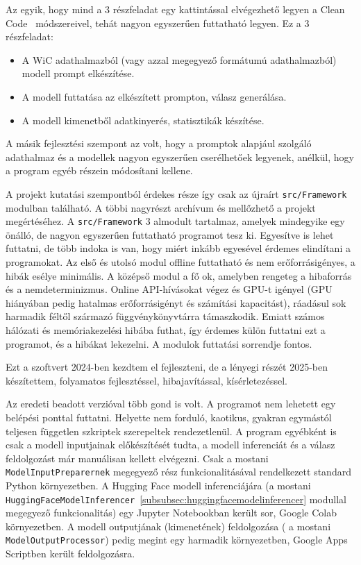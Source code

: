 \documentclass[12pt]{report}
\begin{document}
    Az egyik, hogy mind a 3 részfeladat egy kattintással elvégezhető legyen a Clean Code~\cite{martin2008cleancode} módszereivel, tehát nagyon egyszerűen futtatható legyen. Ez a 3 részfeladat:
    \begin{itemize}
        \item A WiC adathalmazból (vagy azzal megegyező formátumú adathalmazból) modell prompt elkészítése.
        \item A modell futtatása az elkészített prompton, válasz generálása.
        \item A modell kimenetből adatkinyerés, statisztikák készítése.
    \end{itemize}

    A másik fejlesztési szempont az volt, hogy a promptok alapjául szolgáló adathalmaz és a modellek nagyon egyszerűen cserélhetőek legyenek, anélkül, hogy a program egyéb részein módosítani kellene.


    A projekt kutatási szempontból érdekes része így csak az újraírt \texttt{\allowbreak src/Framework} modulban található.
    A többi nagyrészt archívum és mellőzhető a projekt megértéséhez.
    A \texttt{\allowbreak src/Framework} 3 almodult tartalmaz, amelyek mindegyike egy önálló, de nagyon egyszerűen futtatható programot tesz ki. Egyesítve is lehet futtatni, de több indoka is van, hogy miért inkább egyesével érdemes elindítani a programokat. Az első és utolsó modul offline futtatható és nem erőforrásigényes, a hibák esélye minimális. A középső modul a fő ok, amelyben rengeteg a hibaforrás és a nemdeterminizmus. Online API-hívásokat végez és GPU-t igényel (GPU hiányában pedig hatalmas erőforrásigényt és számítási kapacitást), ráadásul sok harmadik féltől származó függvénykönyvtárra támaszkodik. Emiatt számos hálózati és memóriakezelési hibába futhat, így érdemes külön futtatni ezt a programot, és a hibákat lekezelni. A modulok futtatási sorrendje fontos.


    Ezt a szoftvert 2024-ben kezdtem el fejleszteni, de a lényegi részét 2025-ben készítettem, folyamatos fejlesztéssel, hibajavítással, kísérletezéssel.


    Az eredeti beadott verzióval több gond is volt.
    A programot nem lehetett egy belépési ponttal futtatni.
    Helyette nem forduló, kaotikus, gyakran egymástól teljesen független szkriptek szerepeltek rendezetlenül.
    A program egyébként is csak a modell inputjainak előkészítését tudta, a modell inferenciát és a válasz feldolgozást már manuálisan kellett elvégezni.
    Csak a mostani \texttt{\allowbreak ModelInputPreparernek} megegyező rész funkcionalitásával rendelkezett standard Python környezetben.
    A Hugging Face modell inferenciájára (a mostani \texttt{\allowbreak HuggingFaceModelInferencer}~\ref{subsubsec:huggingfacemodelinferencer} modullal megegyező funkcionalitás) egy Jupyter Notebookban került sor, Google Colab környezetben.
    A modell outputjának (kimenetének) feldolgozása ( a mostani\\ \texttt{\allowbreak ModelOutputProcessor}) pedig megint egy harmadik környezetben, Google Apps Scriptben került feldolgozásra.
\end{document}

